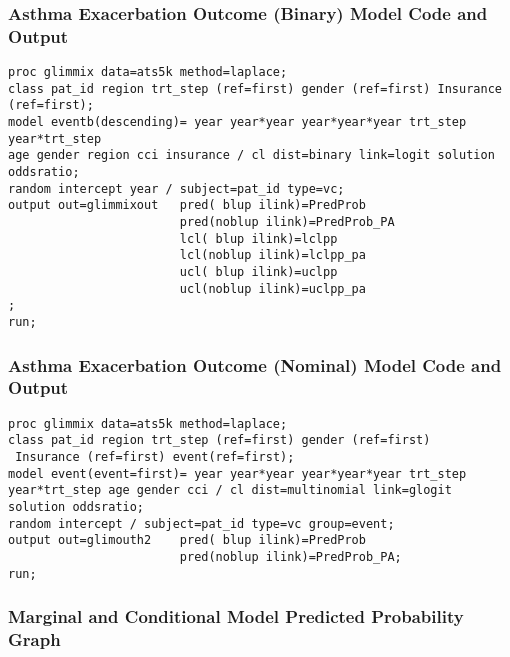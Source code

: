 \documentclass[10pt,a4paper,fleqn]{article}
\begin{document}
{


\subsubsection{Asthma Exacerbation Outcome (Binary) Model Code and Output}
\label{abmo}

\begin{lstlisting}
proc glimmix data=ats5k method=laplace;
class pat_id region trt_step (ref=first) gender (ref=first) Insurance (ref=first);
model eventb(descending)= year year*year year*year*year trt_step year*trt_step 
age gender region cci insurance / cl dist=binary link=logit solution oddsratio;
random intercept year / subject=pat_id type=vc;
output out=glimmixout 	pred( blup ilink)=PredProb
						pred(noblup ilink)=PredProb_PA
						lcl( blup ilink)=lclpp
						lcl(noblup ilink)=lclpp_pa
						ucl( blup ilink)=uclpp
						ucl(noblup ilink)=uclpp_pa
;
run;
\end{lstlisting}




\subsubsection{Asthma Exacerbation Outcome (Nominal) Model Code and Output}
\label{anmo}

\begin{lstlisting}
proc glimmix data=ats5k method=laplace;
class pat_id region trt_step (ref=first) gender (ref=first)
 Insurance (ref=first) event(ref=first);
model event(event=first)= year year*year year*year*year trt_step 
year*trt_step age gender cci / cl dist=multinomial link=glogit solution oddsratio;
random intercept / subject=pat_id type=vc group=event;
output out=glimouth2	pred( blup ilink)=PredProb
						pred(noblup ilink)=PredProb_PA;
run;
\end{lstlisting}




\subsubsection{Marginal and Conditional Model Predicted Probability Graph}
\label{ppg}

}
\end{document}
